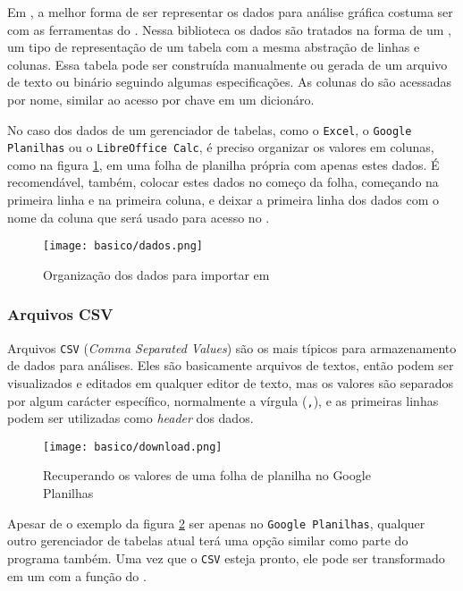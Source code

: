 Em \python, a melhor forma de ser representar os dados para análise gráfica costuma ser com as ferramentas do \pandas. Nessa biblioteca os dados são tratados na forma de um \dataframe, um tipo de representação de um tabela com a mesma abstração de linhas e colunas. Essa tabela pode ser construída manualmente ou gerada de um arquivo de texto ou binário seguindo algumas especificações. As colunas do \dataframe são acessadas por nome, similar ao acesso por chave em um dicionáro.

No caso dos dados de um gerenciador de tabelas, como o \texttt{Excel}, o \texttt{Google Planilhas} ou o \texttt{LibreOffice Calc}, é preciso organizar os valores em colunas, como na figura \ref{fig:basico:dados}, em uma folha de planilha própria com apenas estes dados. É recomendável, também, colocar estes dados no começo da folha, começando na primeira linha e na primeira coluna, e deixar a primeira linha dos dados com o nome da coluna que será usado para acesso no \dataframe.

\begin{figure}[H]
    \centering
    \texttt{[image: basico/dados.png]}

    \caption{Organização dos dados para importar em \python}
    \label{fig:basico:dados}
\end{figure}


\subsubsection{Arquivos CSV}

    Arquivos \texttt{CSV} (\textit{Comma Separated Values}) são os mais típicos para armazenamento de dados para análises. Eles são basicamente arquivos de textos, então podem ser visualizados e editados em qualquer editor de texto, mas os valores são separados por algum carácter específico, normalmente a vírgula (\texttt{,}), e as primeiras linhas podem ser utilizadas como \textit{header} dos dados.

    \begin{figure}[H]
        \centering
        \texttt{[image: basico/download.png]}

        \caption{Recuperando os valores de uma folha de planilha no Google Planilhas}
        \label{fig:basico:download}
    \end{figure}

    Apesar de o exemplo da figura \ref{fig:basico:download} ser apenas no \texttt{Google Planilhas}, qualquer outro gerenciador de tabelas atual terá uma opção similar como parte do programa também. Uma vez que o \texttt{CSV} esteja pronto, ele pode ser transformado em um \dataframe com a função  do \pandas.

